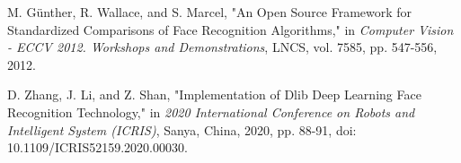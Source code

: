 \begin{thebibliography}{99}
        \item\label{ref28} M. Günther, R. Wallace, and S. Marcel, "An Open Source Framework for Standardized Comparisons of Face Recognition Algorithms," in \emph{Computer Vision - ECCV 2012. Workshops and Demonstrations}, LNCS, vol. 7585, pp. 547-556, 2012.
        
        \item\label{ref28} D. Zhang, J. Li, and Z. Shan, "Implementation of Dlib Deep Learning Face Recognition Technology," in \emph{2020 International Conference on Robots and Intelligent System (ICRIS)}, Sanya, China, 2020, pp. 88-91, doi: 10.1109/ICRIS52159.2020.00030.




\end{thebibliography}